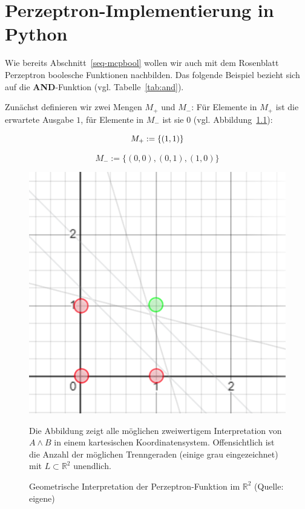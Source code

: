 \chapter{Perzeptron-Implementierung in Python}\label{appendix:pythonperzeptron}

Wie bereits Abschnitt~\ref{seq-mcpbool} wollen wir auch mit dem Rosenblatt Perzeptron boolesche Funktionen nachbilden.
Das folgende Beispiel bezieht sich auf die \textbf{AND}-Funktion (vgl. Tabelle~\ref{tab:and}).

Zunächst definieren wir zwei Mengen $M_+$ und $M_-$: Für Elemente in $M_+$ ist die erwartete Ausgabe $1$, für Elemente in $M_-$ ist sie $0$ (vgl. Abbildung~\ref{fig-rpand}):

\begin{equation}
    M_+ := \{(1, 1)\}\\
\end{equation}

\begin{equation}
    M_- := \{(0, 0), (0,1), (1,0)\}
\end{equation}

\begin{figure}[h]
    \centering
    \includegraphics{chapters/Anhang/perceptron-and}
    \caption{Geometrische Interpretation der Perzeptron-Funktion im $\mathbb{R}^2$ (Quelle: eigene)}
    \label{fig-rpand}
    \small Die Abbildung zeigt alle möglichen zweiwertigem Interpretation von $A \land B$ in einem kartesischen Koordinatensystem. Offensichtlich ist die Anzahl der möglichen Trenngeraden (einige grau eingezeichnet) mit $L \subset  \mathbb{R}^2$ unendlich.
\end{figure}

